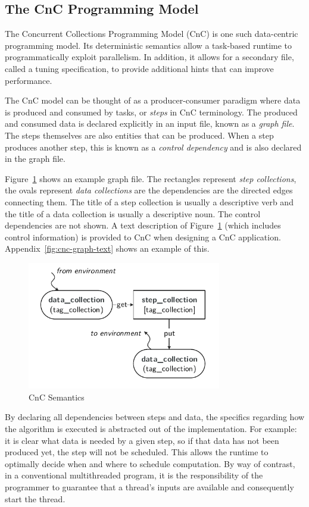 \subsection{The CnC Programming Model}
\label{sec:cnc}

The Concurrent Collections Programming Model (CnC) is one such data-centric 
programming model. Its deterministic semantics allow a task-based runtime to 
programmatically exploit parallelism. In addition, it allows for a secondary 
file, called a tuning specification, to provide additional hints that can 
improve performance.

The CnC model can be thought of as a producer-consumer paradigm where
data is produced and consumed by tasks, or \emph{steps} in CnC
terminology. The produced and consumed data is declared explicitly in
an input file, known as a \emph{graph file}. The steps themselves are
also entities that can be produced. When a step produces another step,
this is known as a \emph{control dependency} and is also declared in the
graph file.

Figure~\ref{fig:cnc_graph} shows an example graph file. The rectangles represent
\emph{step collections}, the ovals represent \emph{data collections} are the
dependencies are the directed edges connecting them. The title of a step
collection is usually a descriptive verb and the title of a data
collection is usually a descriptive noun. The control dependencies are
not shown. A text description of Figure~\ref{fig:cnc_graph} (which
includes control information) is provided to CnC when designing a CnC
application.  Appendix~\ref{fig:cnc-graph-text} shows an example of this.

\begin{figure}[t]
  \centering
  \includegraphics[width=3.33in]{drawings/examples/CnCExample.pdf}
  \caption{CnC Semantics}
  \label{fig:cnc_graph}
\end{figure}

By declaring all dependencies between steps and data, the specifics
regarding how the algorithm is executed is abstracted out of the
implementation. For example: it is clear what data is needed by a
given step, so if that data has not been produced yet, the step will
not be scheduled. This allows the runtime to optimally decide when and
where to schedule computation. By way of contrast, in a conventional
multithreaded program, it is the responsibility of the programmer to
guarantee that a thread's inputs are available and consequently start
the thread.


